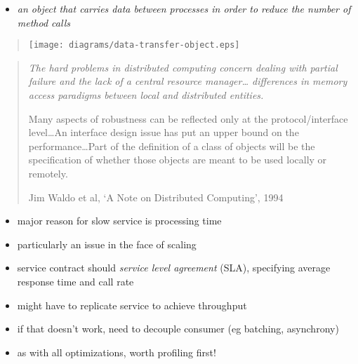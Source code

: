 \documentclass{sepslide-soa-faked} %
\begin{document}
\begin{slide}
\begin{itemize}
\item \emph{an object that carries data between processes in order to reduce the number of method calls}
\end{itemize}
  \begin{quote}
  \texttt{[image: diagrams/data-transfer-object.eps]}
  \end{quote}
\end{slide}

\begin{slide}
\begin{quote} \itshape
The hard problems in distributed computing concern dealing with
partial failure and the lack of a central resource manager\ldots
differences in memory access paradigms between local and distributed
entities.

Many aspects of robustness can be reflected only at the
protocol/interface level\ldots An interface design issue has put an
upper bound on the performance\ldots Part of the definition of a class
of objects will be the specification of whether those objects are
meant to be used locally or remotely.
    \begin{flushright} \upshape
    Jim Waldo et al, `A Note on Distributed Computing', 1994
    \end{flushright}
\end{quote}
\end{slide}

\begin{slide}
\begin{itemize}
\item major reason for slow service is processing time
\item particularly an issue in the face of scaling
\item service contract should \emph{service level agreement} (SLA), specifying average response time and call rate
\item might have to replicate service to achieve throughput
\item if that doesn't work, need to decouple consumer (eg batching, asynchrony)
\item as with all optimizations, worth profiling first!
\end{itemize}
\end{slide}
\end{document}
